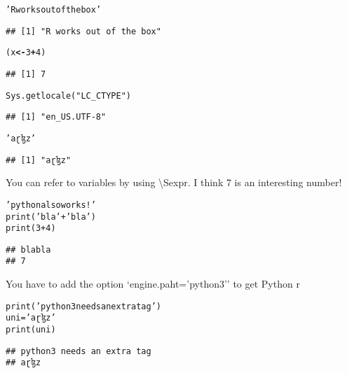 \documentclass[output=inprep,
		biblatex
		]{LSP/langsci}\usepackage[]{graphicx}\usepackage[]{color}
\makeatletter
\newcommand{\hlnum}[1]{\textcolor[rgb]{0.533,0,0.133}{#1}}%
\newcommand{\hlstr}[1]{\textcolor[rgb]{0.667,0.267,0}{#1}}%
\newcommand{\hlopt}[1]{\textcolor[rgb]{0,0,0}{\textbf{#1}}}%
\newcommand{\hlstd}[1]{\textcolor[rgb]{0,0,0}{#1}}%
\newcommand{\hlkwb}[1]{\textcolor[rgb]{0,0,0.4}{\textbf{#1}}}%
\newcommand{\hlkwd}[1]{\textcolor[rgb]{0,0.267,0.4}{#1}}%
\newenvironment{kframe}{%
 \def\at@end@of@kframe{}%
 \ifinner\ifhmode%
  \def\at@end@of@kframe{\end{minipage}}%
  \begin{minipage}{\columnwidth}%
 \fi\fi%
 \def\FrameCommand##1{\hskip\@totalleftmargin \hskip-\fboxsep
 \colorbox{shadecolor}{##1}\hskip-\fboxsep
     \hskip-\linewidth \hskip-\@totalleftmargin \hskip\columnwidth}%
 \MakeFramed {\advance\hsize-\width
   \@totalleftmargin\z@ \linewidth\hsize
   \@setminipage}}%
 {\par\unskip\endMakeFramed%
 \at@end@of@kframe}
\newenvironment{knitrout}{}{} %
\makeatother
\begin{document}
\begin{knitrout}\scriptsize
{}\color{fgcolor}\begin{kframe}
\begin{alltt}
\hlstr{'R works out of the box'}
\end{alltt}
\begin{verbatim}
## [1] "R works out of the box"
\end{verbatim}
\begin{alltt}
\hlstd{(x} \hlkwb{<-} \hlnum{3}\hlopt{+}\hlnum{4}\hlstd{)}
\end{alltt}
\begin{verbatim}
## [1] 7
\end{verbatim}
\begin{alltt}
\hlkwd{Sys.getlocale}\hlstd{(}\hlstr{"LC_CTYPE"}\hlstd{)}
\end{alltt}
\begin{verbatim}
## [1] "en_US.UTF-8"
\end{verbatim}
\begin{alltt}
\hlstr{'aɽɮz'}
\end{alltt}
\begin{verbatim}
## [1] "aɽɮz"
\end{verbatim}
\end{kframe}
\end{knitrout}

You can refer to variables by using \textbackslash Sexpr{}. 
I think 7 is an interesting number!

\begin{knitrout}\scriptsize
{}\color{fgcolor}\begin{kframe}
\begin{alltt}
'python also works!'
print('bla' + 'bla')
print(3+4)
\end{alltt}

\begin{verbatim}
## blabla
## 7
\end{verbatim}
\end{kframe}
\end{knitrout}

You have to add the option `engine.paht='python3'' to get Python r

\begin{knitrout}\scriptsize
{}\color{fgcolor}\begin{kframe}
\begin{alltt}
print('python3 needs an extra tag')
uni = 'aɽɮz'
print(uni)
\end{alltt}

\begin{verbatim}
## python3 needs an extra tag
## aɽɮz
\end{verbatim}
\end{kframe}
\end{knitrout}
\end{document}
